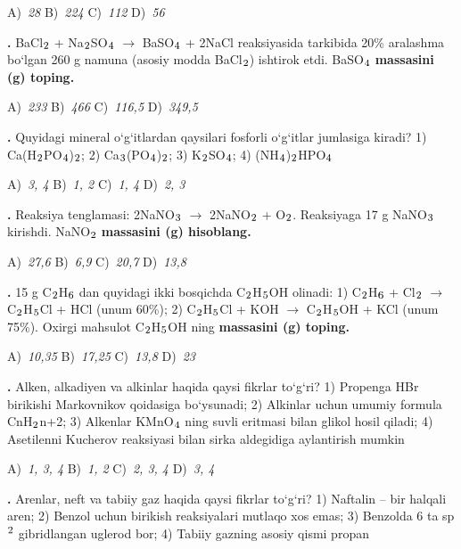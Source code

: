 \documentclass[11pt,a4paper]{article}
\renewcommand{\textsubscript}[1]{\ensuremath{_{\text{\fontsize{8}{8}\selectfont #1}}}}
\renewcommand{\textsuperscript}[1]{\ensuremath{^{\text{\fontsize{8}{8}\selectfont #1}}}}
\newcommand{\qn}[1]{\textbf{\fontsize{11.5}{13}\selectfont #1}}
\newcommand{\qsep}{\par\vspace{1pt}\noindent\rule{0pt}{0.4pt}\par\vspace{5pt}}
\begin{document}
\begin{multicols}{2}
\noindent A)~\textsl{28} \hfill B)~\textsl{224} \hfill C)~\textsl{112} \hfill D)~\textsl{56}\par
\qsep
\noindent\qn{17.} BaCl\textsubscript{2} + Na\textsubscript{2}SO\textsubscript{4} $\to$ BaSO\textsubscript{4} + 2NaCl reaksiyasida tarkibida 20\% aralashma bo`lgan 260 g namuna (asosiy modda BaCl\textsubscript{2}) ishtirok etdi. BaSO\textsubscript{4} \textbf{massasini (g) toping.}

\noindent A)~\textsl{233} \hfill B)~\textsl{466} \hfill C)~\textsl{116,5} \hfill D)~\textsl{349,5}\par
\qsep
\noindent\qn{18.} Quyidagi mineral o`g`itlardan qaysilari fosforli o`g`itlar jumlasiga kiradi? 1) Ca(H\textsubscript{2}PO\textsubscript{4})\textsubscript{2}; 2) Ca\textsubscript{3}(PO\textsubscript{4})\textsubscript{2}; 3) K\textsubscript{2}SO\textsubscript{4}; 4) (NH\textsubscript{4})\textsubscript{2}HPO\textsubscript{4}

\noindent A)~\textsl{3, 4} \hfill B)~\textsl{1, 2} \hfill C)~\textsl{1, 4} \hfill D)~\textsl{2, 3}\par
\qsep
\noindent\qn{19.} Reaksiya tenglamasi: 2NaNO\textsubscript{3} $\to$ 2NaNO\textsubscript{2} + O\textsubscript{2}. Reaksiyaga 17 g NaNO\textsubscript{3} kirishdi. NaNO\textsubscript{2} \textbf{massasini (g) hisoblang.}

\noindent A)~\textsl{27,6} \hfill B)~\textsl{6,9} \hfill C)~\textsl{20,7} \hfill D)~\textsl{13,8}\par
\qsep
\noindent\qn{20.} 15 g C\textsubscript{2}H\textsubscript{6} dan quyidagi ikki bosqichda C\textsubscript{2}H\textsubscript{5}OH olinadi: 1) C\textsubscript{2}H\textsubscript{6} + Cl\textsubscript{2} $\to$ C\textsubscript{2}H\textsubscript{5}Cl + HCl (unum 60\%); 2) C\textsubscript{2}H\textsubscript{5}Cl + KOH $\to$ C\textsubscript{2}H\textsubscript{5}OH + KCl (unum 75\%). Oxirgi mahsulot C\textsubscript{2}H\textsubscript{5}OH ning \textbf{massasini (g) toping.}

\noindent A)~\textsl{10,35} \hfill B)~\textsl{17,25} \hfill C)~\textsl{13,8} \hfill D)~\textsl{23}\par
\qsep
\noindent\qn{21.} Alken, alkadiyen va alkinlar haqida qaysi fikrlar to`g`ri? 1) Propenga HBr birikishi Markovnikov qoidasiga bo`ysunadi; 2) Alkinlar uchun umumiy formula CnH\textsubscript{2}n+2; 3) Alkenlar KMnO\textsubscript{4} ning suvli eritmasi bilan glikol hosil qiladi; 4) Asetilenni Kucherov reaksiyasi bilan sirka aldegidiga aylantirish mumkin

\noindent A)~\textsl{1, 3, 4} \hfill B)~\textsl{1, 2} \hfill C)~\textsl{2, 3, 4} \hfill D)~\textsl{3, 4}\par
\qsep
\noindent\qn{22.} Arenlar, neft va tabiiy gaz haqida qaysi fikrlar to`g`ri? 1) Naftalin -- bir halqali aren; 2) Benzol uchun birikish reaksiyalari mutlaqo xos emas; 3) Benzolda 6 ta sp\textsuperscript{2} gibridlangan uglerod bor; 4) Tabiiy gazning asosiy qismi propan


\end{multicols}
\end{document}

